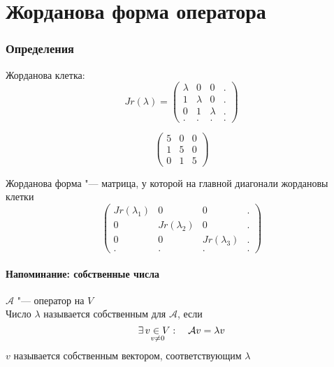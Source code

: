 \part{Жорданова форма оператора}

\section{Определения}

\begin{definition}
	Жорданова клетка:
	$$ Jr(\lambda) =
	\begin{pmatrix}
		\lambda & 0 & 0 & . \\
		1 & \lambda & 0 & . \\
		0 & 1 & \lambda & . \\
		. & . & . & .
	\end{pmatrix} $$
\end{definition}

\begin{eg}
	$$
	\begin{pmatrix}
		5 & 0 & 0 \\
		1 & 5 & 0 \\
		0 & 1 & 5
	\end{pmatrix} $$
\end{eg}

\begin{definition}
	Жорданова форма "--- матрица, у которой на главной диагонали жордановы клетки
	$$
	\begin{pmatrix}
		Jr(\lambda_1) & 0 & 0 & . \\
		0 & Jr(\lambda_2) & 0 & . \\
		0 & 0 & Jr(\lambda_3) & . \\
		. & . & . & .
	\end{pmatrix} $$
\end{definition}

\subsection{Напоминание: собственные числа}

\begin{definition}
	$ \mathcal{A} $ "--- оператор на $ V $ \\
	Число $ \lambda $ называется собственным для $ \mathcal{A} $, если
	$$ \exists\, \underset{v \ne 0}{v \in V} : \quad \mathcal{A}v = \lambda v $$
	$ v $ называется собственным вектором, соответствующим $ \lambda $
\end{definition}

